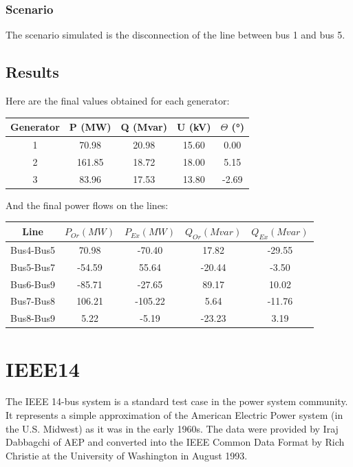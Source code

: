 \documentclass[a4paper, 12pt]{report}
\begin{document}
\subsection{Scenario}
The scenario simulated is the disconnection of the line between bus 1 and bus 5.

\newpage
\section{Results}

Here are the final values obtained for each generator:

\begin{center}
\begin{tabular}{|c|c|c|c|c|}
  \hline
  Generator & P (MW) & Q (Mvar) & U (kV) & $\Theta$ (°) \\
  \hline
  1 & 70.98 & 20.98 & 15.60 & 0.00\\
  2 & 161.85 & 18.72 & 18.00 & 5.15\\
  3 & 83.96 & 17.53 & 13.80 & -2.69\\
  \hline
\end{tabular}
\end{center}

And the final power flows on the lines:

\begin{center}
\begin{tabular}{|c|c|c|c|c|}
  \hline
  Line & $P_{Or} (MW)$ & $P_{Ex} (MW)$ & $Q_{Or} (Mvar)$ & $Q_{Ex} (Mvar)$ \\
  \hline
  Bus4-Bus5 & 70.98 & -70.40 & 17.82 & -29.55 \\
  Bus5-Bus7 & -54.59 & 55.64 & -20.44 & -3.50 \\
  Bus6-Bus9 & -85.71 & -27.65 & 89.17 & 10.02 \\
  Bus7-Bus8 & 106.21 & -105.22 & 5.64 & -11.76 \\
  Bus8-Bus9 & 5.22 & -5.19 & -23.23 & 3.19 \\
  \hline
\end{tabular}
\end{center}

\chapter{IEEE14}

The IEEE 14-bus system is a standard test case in the power system community. It represents a simple approximation of the American Electric Power system (in the U.S. Midwest) as it was in the early 1960s. The data were provided by Iraj Dabbagchi of AEP and converted into the IEEE Common Data Format by Rich Christie at the University of Washington in August 1993.
\end{document}
